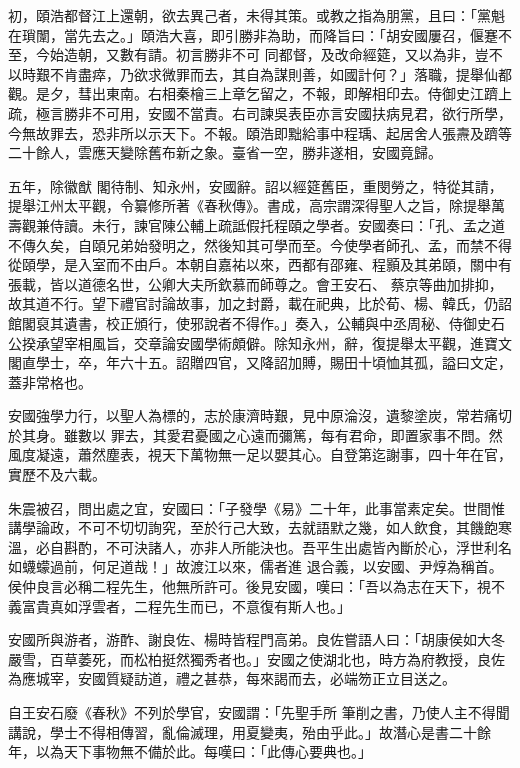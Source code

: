 \begin{pinyinscope}
 初，頤浩都督江上還朝，欲去異己者，未得其策。或教之指為朋黨，且曰：「黨魁在瑣闈，當先去之。」頤浩大喜，即引勝非為助，而降旨曰：「胡安國屢召，偃蹇不至，今始造朝，又數有請。初言勝非不可
 同都督，及改命經筵，又以為非，豈不以時艱不肯盡瘁，乃欲求微罪而去，其自為謀則善，如國計何？」落職，提舉仙都觀。是夕，彗出東南。右相秦檜三上章乞留之，不報，即解相印去。侍御史江躋上疏，極言勝非不可用，安國不當責。右司諫吳表臣亦言安國扶病見君，欲行所學，今無故罪去，恐非所以示天下。不報。頤浩即黜給事中程瑀、起居舍人張燾及躋等二十餘人，雲應天變除舊布新之象。臺省一空，勝非遂相，安國竟歸。



 五年，除徽猷
 閣待制、知永州，安國辭。詔以經筵舊臣，重閔勞之，特從其請，提舉江州太平觀，令纂修所著《春秋傳》。書成，高宗謂深得聖人之旨，除提舉萬壽觀兼侍讀。未行，諫官陳公輔上疏詆假托程頤之學者。安國奏曰：「孔、孟之道不傳久矣，自頤兄弟始發明之，然後知其可學而至。今使學者師孔、孟，而禁不得從頤學，是入室而不由戶。本朝自嘉祐以來，西都有邵雍、程顥及其弟頤，關中有張載，皆以道德名世，公卿大夫所欽慕而師尊之。會王安石、
 蔡京等曲加排抑，故其道不行。望下禮官討論故事，加之封爵，載在祀典，比於荀、楊、韓氏，仍詔館閣裒其遺書，校正頒行，使邪說者不得作。」奏入，公輔與中丞周秘、侍御史石公揆承望宰相風旨，交章論安國學術頗僻。除知永州，辭，復提舉太平觀，進寶文閣直學士，卒，年六十五。詔贈四官，又降詔加賻，賜田十頃恤其孤，謚曰文定，蓋非常格也。



 安國強學力行，以聖人為標的，志於康濟時艱，見中原淪沒，遺黎塗炭，常若痛切於其身。雖數以
 罪去，其愛君憂國之心遠而彌篤，每有君命，即置家事不問。然風度凝遠，蕭然塵表，視天下萬物無一足以嬰其心。自登第迄謝事，四十年在官，實歷不及六載。



 朱震被召，問出處之宜，安國曰：「子發學《易》二十年，此事當素定矣。世間惟講學論政，不可不切切詢究，至於行己大致，去就語默之幾，如人飲食，其饑飽寒溫，必自斟酌，不可決諸人，亦非人所能決也。吾平生出處皆內斷於心，浮世利名如蠛蠓過前，何足道哉！」故渡江以來，儒者進
 退合義，以安國、尹焞為稱首。侯仲良言必稱二程先生，他無所許可。後見安國，嘆曰：「吾以為志在天下，視不義富貴真如浮雲者，二程先生而已，不意復有斯人也。」



 安國所與游者，游酢、謝良佐、楊時皆程門高弟。良佐嘗語人曰：「胡康侯如大冬嚴雪，百草萎死，而松柏挺然獨秀者也。」安國之使湖北也，時方為府教授，良佐為應城宰，安國質疑訪道，禮之甚恭，每來謁而去，必端笏正立目送之。



 自王安石廢《春秋》不列於學官，安國謂：「先聖手所
 筆削之書，乃使人主不得聞講說，學士不得相傳習，亂倫滅理，用夏變夷，殆由乎此。」故潛心是書二十餘年，以為天下事物無不備於此。每嘆曰：「此傳心要典也。」




\end{pinyinscope}
